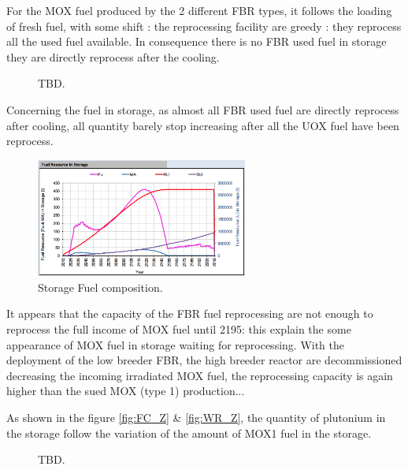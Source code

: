 \documentclass[12pt]{article}
\begin{document}
For the MOX fuel produced by the 2 different FBR types, it follows the loading of fresh fuel, with some shift : the reprocessing facility are greedy : they reprocess all the used fuel available. In consequence there is no FBR used fuel in storage they are directly reprocess after the cooling.


\begin{figure}[h!]
\centering
{}
\caption{TBD.\label{fig:cool_reprocc} }
\end{figure}


Concerning the fuel in storage, as almost all FBR used fuel are directly reprocess after cooling, all quantity barely stop increasing after all the UOX fuel have been reprocess.

\begin{figure}[h!]
\centering
\includegraphics[width=0.62\textwidth]{img/FuelInStorage_1}
\caption{Storage Fuel composition.}
\label{fig:storagecompo_1}
\end{figure}

It appears that the capacity of the FBR fuel reprocessing are not enough to reprocess the full income of MOX fuel until 2195: this explain the some appearance of MOX fuel in storage waiting for reprocessing. With the deployment of the low breeder FBR, the high breeder reactor are decommissioned decreasing the incoming irradiated MOX fuel,  the reprocessing capacity is again higher than the sued MOX (type 1) production...


As shown in the figure \ref{fig:FC_Z} \& \ref{fig:WR_Z}, the quantity of plutonium in the storage follow the variation of the amount of MOX1 fuel in the storage.

\begin{figure}[h!]
\centering
{}
\caption{TBD.\label{fig:FC_WR_zoom} }
\end{figure}
\end{document}
